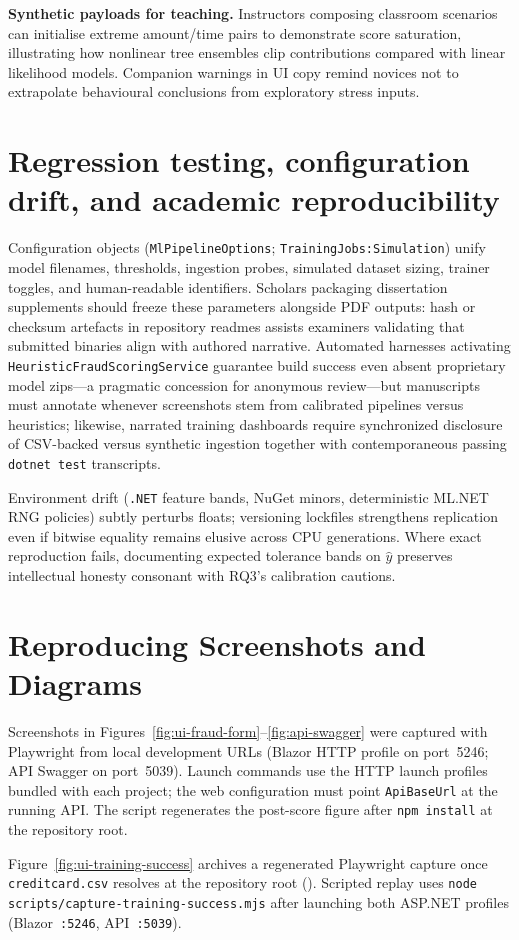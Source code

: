 \textbf{Synthetic payloads for teaching.} Instructors composing classroom scenarios can initialise extreme amount/time pairs to demonstrate score saturation, illustrating how nonlinear tree ensembles clip contributions compared with linear likelihood models. Companion warnings in UI copy remind novices not to extrapolate behavioural conclusions from exploratory stress inputs.

\section{Regression testing, configuration drift, and academic reproducibility}
Configuration objects (\texttt{Ml\allowbreak Pipeline\allowbreak Options}; \texttt{TrainingJobs:\allowbreak Simulation}) unify model filenames, thresholds, ingestion probes, simulated dataset sizing, trainer toggles, and human-readable identifiers. Scholars packaging dissertation supplements should freeze these parameters alongside PDF outputs: hash or checksum artefacts in repository readmes assists examiners validating that submitted binaries align with authored narrative. Automated harnesses activating \texttt{Heuristic\allowbreak Fraud\allowbreak Scoring\allowbreak Service} guarantee build success even absent proprietary model zips---a pragmatic concession for anonymous review---but manuscripts must annotate whenever screenshots stem from calibrated pipelines versus heuristics; likewise, narrated training dashboards require synchronized disclosure of CSV-backed versus synthetic ingestion together with contemporaneous passing \texttt{dotnet test} transcripts.

Environment drift (\texttt{.NET} feature bands, NuGet minors, deterministic ML.NET RNG policies) subtly perturbs floats; versioning lockfiles strengthens replication even if bitwise equality remains elusive across CPU generations. Where exact reproduction fails, documenting expected tolerance bands on $\hat{y}$ preserves intellectual honesty consonant with RQ3's calibration cautions.

\section{Reproducing Screenshots and Diagrams}
Screenshots in Figures~\ref{fig:ui-fraud-form}--\ref{fig:api-swagger} were captured with Playwright from local development URLs (Blazor HTTP profile on port~5246; API Swagger on port~5039). Launch commands use the HTTP launch profiles bundled with each project; the web configuration must point \texttt{ApiBaseUrl} at the running API. The script  regenerates the post-score figure after \texttt{npm install} at the repository root.

\noindent
Figure~\ref{fig:ui-training-success} archives a regenerated Playwright capture once \texttt{creditcard.csv} resolves at the repository root (). Scripted replay uses \texttt{node scripts/\allowbreak capture-training-success.mjs} after launching both ASP.NET profiles (Blazor~\texttt{:5246}, API~\texttt{:5039}).
